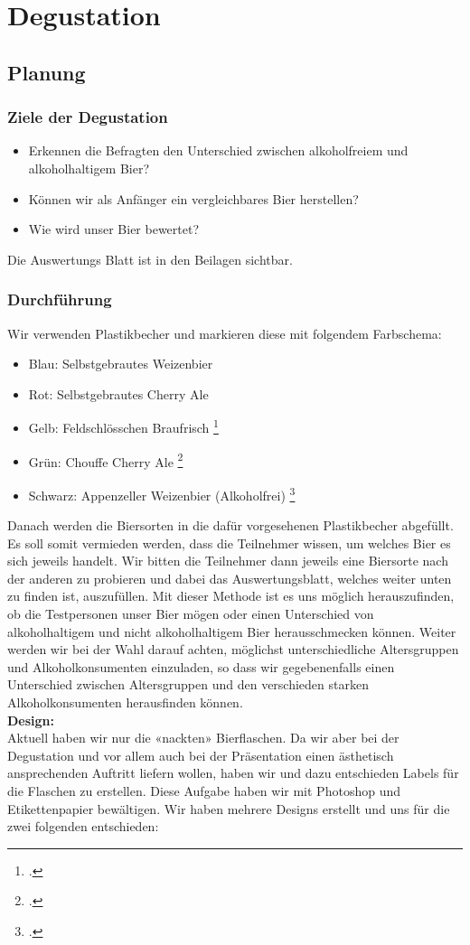 \newpage
\section{Degustation}
\subsection{Planung}
\subsubsection{Ziele der Degustation}
\begin{itemize}
    \item Erkennen die Befragten den Unterschied zwischen alkoholfreiem und alkoholhaltigem Bier?
    \item Können wir als Anfänger ein vergleichbares Bier herstellen?
    \item Wie wird unser Bier bewertet?
\end{itemize}
Die Auswertungs Blatt ist in den Beilagen sichtbar.
\subsubsection{Durchführung}
Wir verwenden Plastikbecher und markieren diese mit folgendem Farbschema:
\begin{itemize}
    \item Blau: 	Selbstgebrautes Weizenbier
    \item Rot:		Selbstgebrautes Cherry Ale
    \item Gelb: 	Feldschlösschen Braufrisch \footcite[Internet shop - Braufrisch Bier 6 x 0.5 l]{brack}
    \item Grün:		Chouffe Cherry Ale \footcite[CHOUFFE Cherry]{Manor}
    \item Schwarz:	Appenzeller Weizenbier (Alkoholfrei) \footcite[Appenzeller Bier Sonnenwendlig alkoholfrei]{Coop}
\end{itemize}

Danach werden die Biersorten in die dafür vorgesehenen Plastikbecher abgefüllt. Es soll somit vermieden werden, dass die Teilnehmer wissen, um welches Bier es sich jeweils handelt.
Wir bitten die Teilnehmer dann jeweils eine Biersorte nach der anderen zu probieren und dabei das Auswertungsblatt, welches weiter unten zu finden ist, auszufüllen. Mit dieser Methode ist es uns möglich herauszufinden, ob die Testpersonen unser Bier mögen oder einen Unterschied von alkoholhaltigem und nicht alkoholhaltigem Bier herausschmecken können. Weiter werden wir bei der Wahl darauf achten, möglichst unterschiedliche Altersgruppen und Alkoholkonsumenten einzuladen, so dass wir gegebenenfalls einen Unterschied zwischen Altersgruppen und den verschieden starken Alkoholkonsumenten herausfinden können.
\\\newpage
\textbf{Design:}\\
Aktuell haben wir nur die «nackten» Bierflaschen. Da wir aber bei der Degustation und vor allem auch bei der Präsentation einen ästhetisch ansprechenden Auftritt liefern wollen, haben wir und dazu entschieden Labels für die Flaschen zu erstellen. Diese Aufgabe haben wir mit Photoshop und Etikettenpapier bewältigen. Wir haben mehrere Designs erstellt und uns für die zwei folgenden entschieden:

